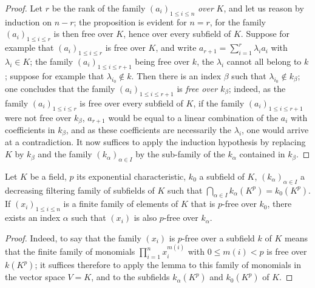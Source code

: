 \begin{proof}
Let $r$ be the rank of the family $(a_i)_{1\leqslant i\leqslant n}$ \emph{over} $K$, and let us reason by induction on $n-r$; the proposition is evident for $n=r$, for the family $(a_i)_{1\leqslant i\leqslant r}$ is then free over $K$, hence over every subfield of $K$.
Suppose for example that $(a_i)_{1\leqslant i\leqslant r}$ is free over $K$, and write $a_{r+1}=\sum_{i=1}^r\lambda_i a_i$ with $\lambda_i\in K$; the family $(a_i)_{1\leqslant i\leqslant r+1}$ being free over $k$, the $\lambda_i$ cannot all belong to $k$; suppose for example that $\lambda_{i_0}\notin k$.
Then there is an index $\beta$ such that $\lambda_{i_0}\notin k_\beta$; one concludes that the family $(a_i)_{1\leqslant i\leqslant r+1}$ is \emph{free over $k_\beta$}; indeed, as the family $(a_i)_{1\leqslant i\leqslant r}$ is free over every subfield of $K$, if the family $(a_i)_{1\leqslant i\leqslant r+1}$ were not free over $k_\beta$, $a_{r+1}$ would be equal to a linear combination of the $a_i$ with coefficients in $k_\beta$, and as these coefficients are necessarily the $\lambda_i$, one would arrive at a contradiction.
It now suffices to apply the induction hypothesis by replacing $K$ by $k_\beta$ and the family $(k_\alpha)_{\alpha\in I}$ by the sub-family of the $k_\alpha$ contained in $k_\beta$.
\end{proof}

\begin{lemma}[21.8.2]
\label{0.21.8.2}
Let $K$ be a field, $p$ its exponential characteristic, $k_0$ a subfield of $K$, $(k_\alpha)_{\alpha\in I}$ a decreasing filtering family of subfields of $K$ such that $\bigcap_{\alpha\in I}k_\alpha(K^p)=k_0(K^p)$.
If $(x_i)_{1\leqslant i\leqslant n}$ is a finite family of elements of $K$ that is $p$-free over $k_0$, there exists an index $\alpha$ such that $(x_i)$ is also $p$-free over $k_\alpha$.
\end{lemma}

\begin{proof}
Indeed, to say that the family $(x_i)$ is $p$-free over a subfield $k$ of $K$ means that the finite family of monomials $\prod_{i=1}^n x_i^{m(i)}$ with $0\leqslant m(i)<p$ is free over $k(K^p)$; it suffices therefore to apply the lemma  to this family of monomials in the vector space $V=K$, and to the subfields $k_\alpha(K^p)$ and $k_0(K^p)$ of $K$.
\end{proof}

